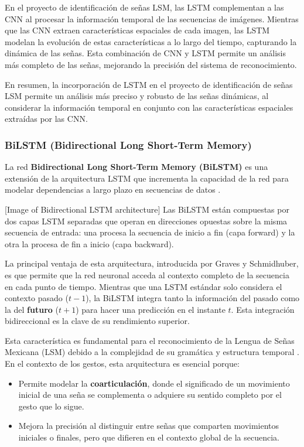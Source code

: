 En el proyecto de identificación de señas LSM, las LSTM complementan a las CNN al procesar la información temporal de las secuencias de imágenes. Mientras que las CNN extraen características espaciales de cada imagen, las LSTM modelan la evolución de estas características a lo largo del tiempo, capturando la dinámica de las señas. Esta combinación de CNN y LSTM permite un análisis más completo de las señas, mejorando la precisión del sistema de reconocimiento.

En resumen, la incorporación de LSTM en el proyecto de identificación de señas LSM permite un análisis más preciso y robusto de las señas dinámicas, al considerar la información temporal en conjunto con las características espaciales extraídas por las CNN.

\subsubsection{BiLSTM (Bidirectional Long Short-Term Memory)}

La red \textbf{Bidirectional Long Short-Term Memory (BiLSTM)} es una extensión de la arquitectura LSTM que incrementa la capacidad de la red para modelar dependencias a largo plazo en secuencias de datos \cite{ref43}.

[Image of Bidirectional LSTM architecture]
Las BiLSTM están compuestas por dos capas LSTM separadas que operan en direcciones opuestas sobre la misma secuencia de entrada: una procesa la secuencia de inicio a fin (capa forward) y la otra la procesa de fin a inicio (capa backward).

La principal ventaja de esta arquitectura, introducida por Graves y Schmidhuber, es que permite que la red neuronal acceda al contexto completo de la secuencia en cada punto de tiempo. Mientras que una LSTM estándar solo considera el contexto pasado ($t-1$), la BiLSTM integra tanto la información del pasado como la del \textbf{futuro} ($t+1$) para hacer una predicción en el instante $t$. Esta integración bidireccional es la clave de su rendimiento superior.

Esta característica es fundamental para el reconocimiento de la Lengua de Señas Mexicana (LSM) debido a la complejidad de su gramática y estructura temporal \cite{ref42}. En el contexto de los gestos, esta arquitectura es esencial porque:
\begin{itemize}
    \item  Permite modelar la \textbf{coarticulación}, donde el significado de un movimiento inicial de una seña se complementa o adquiere su sentido completo por el gesto que lo sigue.
    \item  Mejora la precisión al distinguir entre señas que comparten movimientos iniciales o finales, pero que difieren en el contexto global de la secuencia.
\end{itemize}

